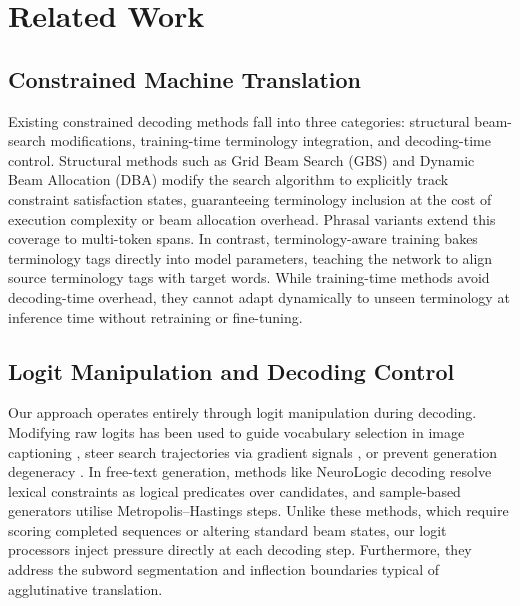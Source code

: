 \documentclass{tlp}
\begin{document}
\section{Related Work}

\subsection{Constrained Machine Translation}

Existing constrained decoding methods fall into three categories: structural
beam-search modifications, training-time terminology integration, and decoding-time
control. Structural methods such as Grid Beam Search (GBS)
\citep{hokamp2017lexically} and Dynamic Beam Allocation (DBA) \citep{post2018fast}
modify the search algorithm to explicitly track constraint satisfaction states,
guaranteeing terminology inclusion at the cost of execution complexity or beam
allocation overhead. Phrasal variants \citep{hu2019improved} extend this coverage
to multi-token spans. In contrast, terminology-aware training \citep{dinu2019training}
bakes terminology tags directly into model parameters, teaching the network to align
source terminology tags with target words. While training-time methods avoid
decoding-time overhead, they cannot adapt dynamically to unseen terminology at
inference time without retraining or fine-tuning.

\subsection{Logit Manipulation and Decoding Control}

Our approach operates entirely through logit manipulation during decoding. Modifying
raw logits has been used to guide vocabulary selection in image captioning
\citep{anderson2017guided}, steer search trajectories via gradient signals
\citep{sha2020gradient}, or prevent generation degeneracy \citep{holtzman2020curious}.
In free-text generation, methods like NeuroLogic decoding \citep{lu2021neurologic}
resolve lexical constraints as logical predicates over candidates, and sample-based
generators \citep{miao2019cgmh} utilise Metropolis--Hastings steps. Unlike these
methods, which require scoring completed sequences or altering standard beam states,
our logit processors inject pressure directly at each decoding step. Furthermore,
they address the subword segmentation and inflection boundaries typical of
agglutinative translation.
\end{document}
